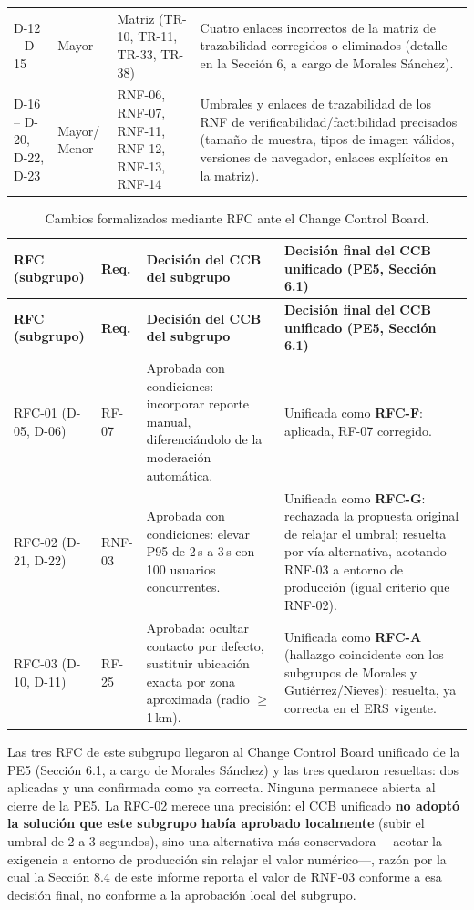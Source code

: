 \documentclass[journal,onecolumn]{IEEEtran}
\begin{document}
\begin{longtable}{C{1.2cm} L{1.7cm} L{2.5cm} L{7cm}}
	\addlinespace
	D-12 -- D-15 & Mayor & Matriz (TR-10, TR-11, TR-33, TR-38) & Cuatro enlaces incorrectos de la matriz de trazabilidad corregidos o eliminados (detalle en la Sección 6, a cargo de Morales Sánchez). \\
	\addlinespace
	D-16 -- D-20, D-22, D-23 & Mayor/ Menor & RNF-06, RNF-07, RNF-11, RNF-12, RNF-13, RNF-14 & Umbrales y enlaces de trazabilidad de los RNF de verificabilidad/factibilidad precisados (tamaño de muestra, tipos de imagen válidos, versiones de navegador, enlaces explícitos en la matriz). \\
\end{longtable}

\begin{longtable}{L{2.7cm} L{1.6cm} L{4cm} L{5.8cm}}
	\caption{Cambios formalizados mediante RFC ante el Change Control Board.}\label{tab:rfc-fuertes}\\
	\toprule
	\textbf{RFC (subgrupo)} & \textbf{Req.} & \textbf{Decisión del CCB del subgrupo} & \textbf{Decisión final del CCB unificado (PE5, Sección 6.1)} \\
	\midrule
	\endfirsthead
	\toprule
	\textbf{RFC (subgrupo)} & \textbf{Req.} & \textbf{Decisión del CCB del subgrupo} & \textbf{Decisión final del CCB unificado (PE5, Sección 6.1)} \\
	\midrule
	\endhead
	\bottomrule
	\endfoot
	RFC-01 (D-05, D-06) & RF-07 & Aprobada con condiciones: incorporar reporte manual, diferenciándolo de la moderación automática. & Unificada como \textbf{RFC-F}: aplicada, RF-07 corregido. \\
	\addlinespace
	RFC-02 (D-21, D-22) & RNF-03 & Aprobada con condiciones: elevar P95 de 2\,s a 3\,s con 100 usuarios concurrentes. & Unificada como \textbf{RFC-G}: rechazada la propuesta original de relajar el umbral; resuelta por vía alternativa, acotando RNF-03 a entorno de producción (igual criterio que RNF-02). \\
	\addlinespace
	RFC-03 (D-10, D-11) & RF-25 & Aprobada: ocultar contacto por defecto, sustituir ubicación exacta por zona aproximada (radio $\geq$ 1\,km). & Unificada como \textbf{RFC-A} (hallazgo coincidente con los subgrupos de Morales y Gutiérrez/Nieves): resuelta, ya correcta en el ERS vigente. \\
\end{longtable}

Las tres RFC de este subgrupo llegaron al Change Control Board unificado de la PE5 (Sección 6.1, a cargo de Morales Sánchez) y las tres quedaron resueltas: dos aplicadas y una confirmada como ya correcta. Ninguna permanece abierta al cierre de la PE5. La RFC-02 merece una precisión: el CCB unificado \textbf{no adoptó la solución que este subgrupo había aprobado localmente} (subir el umbral de 2 a 3 segundos), sino una alternativa más conservadora ---acotar la exigencia a entorno de producción sin relajar el valor numérico---, razón por la cual la Sección 8.4 de este informe reporta el valor de RNF-03 conforme a esa decisión final, no conforme a la aprobación local del subgrupo.
\end{document}
